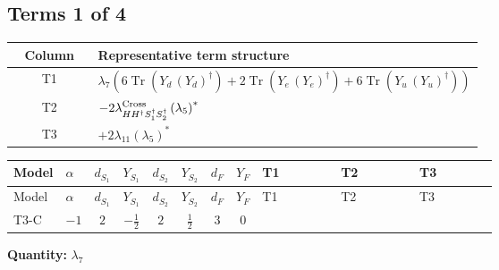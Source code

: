 \documentclass[8pt]{article}
\begin{document}
\begin{landscape}
\subsection*{Terms 1 of 4}
\begin{center}
\begin{tabular}{@{}c >{\raggedright\arraybackslash}p{0.82\linewidth}@{}}
\toprule
Column & Representative term structure \\
\midrule
T1 & \(\displaystyle {\lambda_{7}} (6 \operatorname{Tr}\!\left({Y_d}\,\left({Y_d}\right)^{\dagger}\right)+2 \operatorname{Tr}\!\left({Y_e}\,\left({Y_e}\right)^{\dagger}\right)+6 \operatorname{Tr}\!\left({Y_u}\,\left({Y_u}\right)^{\dagger}\right))\) \\
\midrule
T2 & \(\displaystyle -2 {\lambda_{H H^\dagger S_1^\dagger S_2^\dagger}^{\rm Cross}} \left({\lambda_5}\right)^{*}\) \\
\midrule
T3 & \(\displaystyle +2 {\lambda_{11}} \left({\lambda_5}\right)^{*}\) \\
\midrule
\bottomrule
\end{tabular}
\end{center}
\smallskip
\tiny
\begin{longtable}{@{}llcccccc >{\raggedright\arraybackslash}p{0.21\linewidth} >{\raggedright\arraybackslash}p{0.21\linewidth} >{\raggedright\arraybackslash}p{0.21\linewidth}@{}}
\toprule
Model & $\alpha$ & $d_{S_1}$ & $Y_{S_1}$ & $d_{S_2}$ & $Y_{S_2}$ & $d_F$ & $Y_F$ & T1 & T2 & T3 \\
\midrule
\endfirsthead
\toprule
Model & $\alpha$ & $d_{S_1}$ & $Y_{S_1}$ & $d_{S_2}$ & $Y_{S_2}$ & $d_F$ & $Y_F$ & T1 & T2 & T3 \\
\midrule
\endhead
T3-C & $-1$ & $2$ & $-\frac{1}{2}$ & $2$ & $\frac{1}{2}$ & $3$ & $0$ & \scriptsize\adjustbox{max width=\linewidth}{$\begin{gathered} {\lambda_{7}} (6 \operatorname{Tr}\!\left({Y_d}\,\left({Y_d}\right)^{\dagger}\right)+2 \operatorname{Tr}\!\left({Y_e}\,\left({Y_e}\right)^{\dagger}\right)+6 \operatorname{Tr}\!\left({Y_u}\,\left({Y_u}\right)^{\dagger}\right))\end{gathered}$} & \scriptsize\adjustbox{max width=\linewidth}{$\begin{gathered} -2 {\lambda_{H H^\dagger S_1^\dagger S_2^\dagger}^{\rm Cross}} \left({\lambda_5}\right)^{*}\end{gathered}$} & \scriptsize\adjustbox{max width=\linewidth}{$\begin{gathered} +2 {\lambda_{11}} \left({\lambda_5}\right)^{*}\end{gathered}$} \\
\midrule
\bottomrule
\end{longtable}
\clearpage
\noindent\textbf{Quantity: }$\lambda_{7}$\par\smallskip

\end{landscape}
\end{document}
